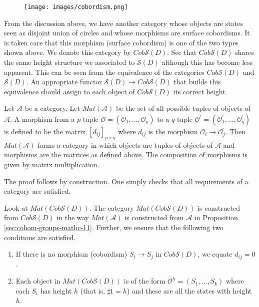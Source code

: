 \begin{figure}[h]
  \centering
  \texttt{[image: images/cobordism.png]}
\end{figure}

From the discussion above, we have another category whose objects are states seen as disjoint union of circles and whose morphisms are surface cobordisms. It is taken care that this morphism (surface cobordism) is one of the two types shown above. We denote this category by $Cob\mathcal{S}(D)$. See that $Cob\mathcal{S}(D)$ shares the same height structure we associated to $\mathcal{S}(D)$ although this has become less apparent. This can be seen from the equivalence of the categories $Cob\mathcal{S}(D)$ and $\mathcal{S}(D)$. An appropriate functor $\mathcal{S}(D) \to Cob\mathcal{S}(D)$ that builds this equivalence should assign to each object of $Cob\mathcal{S}(D)$ its correct height.

\begin{proposition}
\label{sec:cohom-groups-mathc-11}
Let $\mathcal{A}$ be a category. Let $Mat(\mathcal{A})$ be the set of all possible tuples of objects of $\mathcal{A}$. A morphism from a $p$-tuple $\mathcal{O} = (\mathcal{O}_1, \ldots, \mathcal{O}_p)$ to a $q$-tuple $\mathcal{O}^{\prime} = (\mathcal{O}_1^{\prime}, \ldots, \mathcal{O}_q^{\prime})$ is defined to be the matrix $[d_{ij}]_{p\times q}$ where $d_{ij}$ is the morphism $\mathcal{O}_i \to \mathcal{O}_j^{\prime}$. Then $Mat(\mathcal{A})$ forms a category in which objects are tuples of objects of $\mathcal{A}$ and morphisms are the matrices as defined above. The composition of morphisms is given by matrix multiplication.
\end{proposition}

The proof follows by construction. One simply checks that all requirements of a category are satisfied.

Look at $Mat(Cob\mathcal{S}(D))$. The category $Mat(Cob\mathcal{S}(D))$ is constructed from $Cob\mathcal{S}(D)$ in the way $Mat(\mathcal{A})$ is constructed from $\mathcal{A}$ in Proposition \ref{sec:cohom-groups-mathc-11}. Further, we ensure that the following two conditions are satisfied. 
\begin{enumerate}
\item\label{item:1} If there is no morphism (cobordism) $S_i \to S_j$ in $Cob\mathcal{S}(D)$, we equate $d_{ij} = 0$.
\item\label{item:2} Each object in $Mat(Cob\mathcal{S}(D))$ is of the form $\mathcal{O}^h = (S_1, \ldots, S_k)$ where each $S_i$ has height $h$ (that is, $\sharp 1 = h$) and these are all the states with height $h$.
\end{enumerate}

